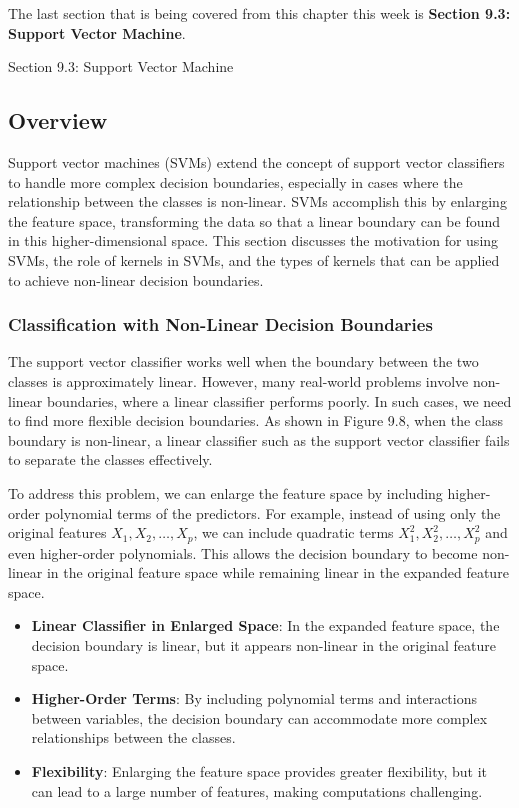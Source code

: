 The last section that is being covered from this chapter this week is \textbf{Section 9.3: Support Vector Machine}.

\begin{notes}{Section 9.3: Support Vector Machine}
    \subsection*{Overview}

    Support vector machines (SVMs) extend the concept of support vector classifiers to handle more complex decision boundaries, especially in cases where the relationship between the classes is non-linear. 
    SVMs accomplish this by enlarging the feature space, transforming the data so that a linear boundary can be found in this higher-dimensional space. This section discusses the motivation for using 
    SVMs, the role of kernels in SVMs, and the types of kernels that can be applied to achieve non-linear decision boundaries.
    
    \subsubsection*{Classification with Non-Linear Decision Boundaries}
    
    The support vector classifier works well when the boundary between the two classes is approximately linear. However, many real-world problems involve non-linear boundaries, where a linear classifier 
    performs poorly. In such cases, we need to find more flexible decision boundaries. As shown in Figure 9.8, when the class boundary is non-linear, a linear classifier such as the support vector classifier 
    fails to separate the classes effectively.
    
    To address this problem, we can enlarge the feature space by including higher-order polynomial terms of the predictors. For example, instead of using only the original features \(X_1, X_2, \dots, X_p\), 
    we can include quadratic terms \(X_1^2, X_2^2, \dots, X_p^2\) and even higher-order polynomials. This allows the decision boundary to become non-linear in the original feature space while remaining 
    linear in the expanded feature space.
    
    \begin{highlight}
        \begin{itemize}
            \item \textbf{Linear Classifier in Enlarged Space}: In the expanded feature space, the decision boundary is linear, but it appears non-linear in the original feature space.
            \item \textbf{Higher-Order Terms}: By including polynomial terms and interactions between variables, the decision boundary can accommodate more complex relationships between the classes.
            \item \textbf{Flexibility}: Enlarging the feature space provides greater flexibility, but it can lead to a large number of features, making computations challenging.
        \end{itemize}
    \end{highlight}
    

\end{notes}
